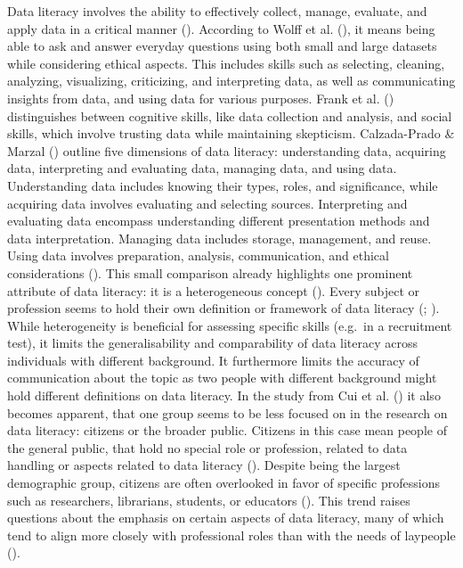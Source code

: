 \documentclass[
  12pt,
  a4paper,
  twoside]{article}
\begin{document}
Data literacy involves the ability to effectively collect, manage, evaluate, and apply data in a critical manner (). According to Wolff et al. (), it means being able to ask and answer everyday questions using both small and large datasets while considering ethical aspects. This includes skills such as selecting, cleaning, analyzing, visualizing, criticizing, and interpreting data, as well as communicating insights from data, and using data for various purposes. Frank et al. () distinguishes between cognitive skills, like data collection and analysis, and social skills, which involve trusting data while maintaining skepticism. Calzada-Prado \& Marzal () outline five dimensions of data literacy: understanding data, acquiring data, interpreting and evaluating data, managing data, and using data. Understanding data includes knowing their types, roles, and significance, while acquiring data involves evaluating and selecting sources. Interpreting and evaluating data encompass understanding different presentation methods and data interpretation. Managing data includes storage, management, and reuse. Using data involves preparation, analysis, communication, and ethical considerations ().
This small comparison already highlights one prominent attribute of data literacy: it is a heterogeneous concept (). Every subject or profession seems to hold their own definition or framework of data literacy (; ). While heterogeneity is beneficial for assessing specific skills (e.g.~in a recruitment test), it limits the generalisability and comparability of data literacy across individuals with different background. It furthermore limits the accuracy of communication about the topic as two people with different background might hold different definitions on data literacy. In the study from Cui et al. () it also becomes apparent, that one group seems to be less focused on in the research on data literacy: citizens or the broader public. Citizens in this case mean people of the general public, that hold no special role or profession, related to data handling or aspects related to data literacy ().
Despite being the largest demographic group, citizens are often overlooked in favor of specific professions such as researchers, librarians, students, or educators (). This trend raises questions about the emphasis on certain aspects of data literacy, many of which tend to align more closely with professional roles than with the needs of laypeople ().
\end{document}
